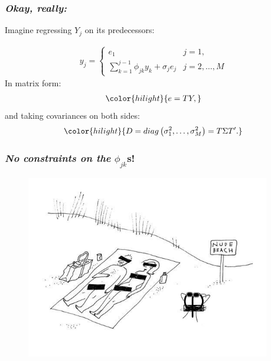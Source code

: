 \documentclass[12pt]{beamer}
\newcommand{\newmaththought}[1]{{ \color{hilight} {#1}}}
\begin{document}
\begin{frame}
\frametitle{\emph{Okay, really:}}

Imagine regressing $Y_j$ on its predecessors:

\begin{align} \label{eq:ARmodel}
y_{j}  = \left\{  \begin{array}{ll} 
		e_1 &j=1, \\
  \sum \limits_{k=1}^{j-1} \phi_{jk} y_{k} + \sigma_{j}e_{j} &  j=2,\dots,M
\end{array}\right.
\end{align}
\noindent
In matrix form:
\begin{align}
\newmaththought{ e = TY,}
\end{align}
\noindent
 and taking covariances on both sides:
\begin{equation}
\newmaththought{ D = diag\left( \sigma_1^2,\dots, \sigma_M^2 \right) = T \Sigma T^\prime.}
\end{equation}
\end{frame}








\begin{frame}
\frametitle{\emph{No constraints on the} $\phi_{jk}$s!}

\begin{adjustwidth}{-3cm}{-3cm}
\begin{center}
\begin{figure}
\graphicspath{{img/}}
  \includegraphics[height=8cm]{nude-beach}
\end{figure}
\end{center}
  \end{adjustwidth}
\end{frame}
\end{document}
